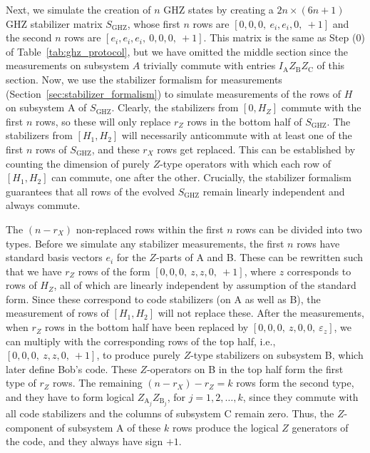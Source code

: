 \documentclass[journal,onecolumn]{IEEEtran}
\begin{document}
Next, we simulate the creation of $n$ GHZ states by creating a $2n \times (6n+1)$ GHZ stabilizer matrix $S_{\text{GHZ}}$, whose first $n$ rows are $[0,0,0,\ e_i,e_i,0,\ +1]$ and the second $n$ rows are $[e_i,e_i,e_i,\ 0,0,0,\ +1]$.
This matrix is the same as Step (0) of Table~\ref{tab:ghz_protocol}, but we have omitted the middle section since the measurements on subsystem $A$ trivially commute with entries $I_{\text{A}} Z_{\text{B}} Z_{\text{C}}$ of this section.
Now, we use the stabilizer formalism for measurements (Section~\ref{sec:stabilizer_formalism}) to simulate measurements of the rows of $H$ on subsystem A of $S_{\text{GHZ}}$.
Clearly, the stabilizers from $[0,H_Z]$ commute with the first $n$ rows, so these will only replace $r_Z$ rows in the bottom half of $S_{\text{GHZ}}$.
The stabilizers from $[H_1,H_2]$ will necessarily anticommute with at least one of the first $n$ rows of $S_{\text{GHZ}}$, and these $r_X$ rows get replaced.
This can be established by counting the dimension of purely $Z$-type operators with which each row of $[H_1,H_2]$ can commute, one after the other.
Crucially, the stabilizer formalism guarantees that all rows of the evolved $S_{\text{GHZ}}$ remain linearly independent and always commute.


The $(n-r_X)$ non-replaced rows within the first $n$ rows can be divided into two types. 
Before we simulate any stabilizer measurements, the first $n$ rows have standard basis vectors $e_i$ for the $Z$-parts of A and B. 
These can be rewritten such that we have $r_Z$ rows of the form $[0,0,0,\ z,z,0,\ +1]$, where $z$ corresponds to rows of $H_Z$, all of which are linearly independent by assumption of the standard form.
Since these correspond to code stabilizers (on A as well as B), the measurement of rows of $[H_1,H_2]$ will not replace these.
After the measurements, when $r_Z$ rows in the bottom half have been replaced by $[0,0,0,\ z,0,0,\ \varepsilon_z]$, we can multiply with the corresponding rows of the top half, i.e., $[0,0,0,\ z,z,0,\ +1]$, to produce purely $Z$-type stabilizers on subsystem B, which later define Bob's code.
These $Z$-operators on B in the top half form the first type of $r_Z$ rows.
The remaining $(n-r_X)-r_Z = k$ rows form the second type, and they have to form logical $Z_{\text{A}_j} Z_{\text{B}_j}$, for $j=1,2,\ldots,k$, since they commute with all code stabilizers and the columns of subsystem C remain zero.
Thus, the $Z$-component of subsystem A of these $k$ rows produce the logical $Z$ generators of the code, and they always have sign $+1$.
\end{document}
